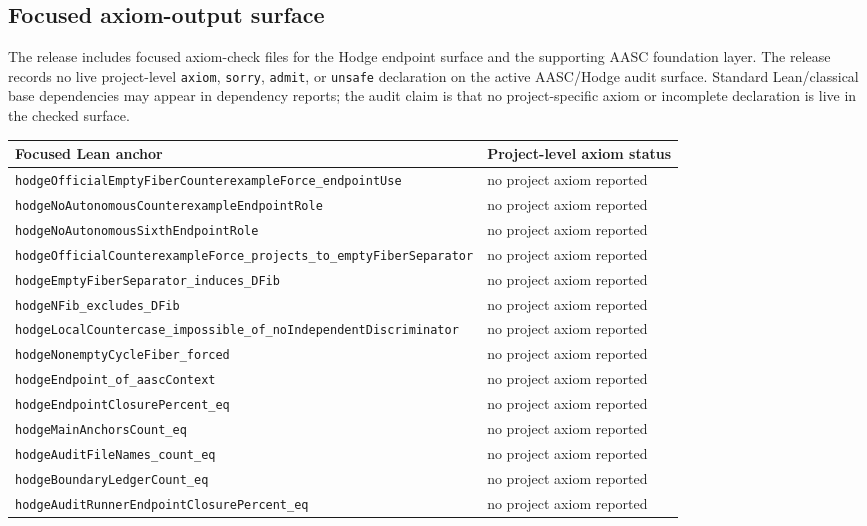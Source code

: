 \documentclass[11pt]{article}
\begin{document}
\subsection{Focused axiom-output surface}

The release includes focused axiom-check files for the Hodge endpoint surface and the supporting AASC foundation layer. The release records no live project-level \texttt{axiom}, \texttt{sorry}, \texttt{admit}, or \texttt{unsafe} declaration on the active AASC/Hodge audit surface. Standard Lean/classical base dependencies may appear in dependency reports; the audit claim is that no project-specific axiom or incomplete declaration is live in the checked surface.

{\scriptsize
\begin{longtable}{p{}p{}}
\toprule Focused Lean anchor & Project-level axiom status\\ \midrule\endhead
\texttt{hodgeOfficialEmptyFiberCounterexampleForce\_endpointUse} & no project axiom reported\\
\texttt{hodgeNoAutonomousCounterexampleEndpointRole} & no project axiom reported\\
\texttt{hodgeNoAutonomousSixthEndpointRole} & no project axiom reported\\
\texttt{hodgeOfficialCounterexampleForce\_projects\_to\_emptyFiberSeparator} & no project axiom reported\\
\texttt{hodgeEmptyFiberSeparator\_induces\_DFib} & no project axiom reported\\
\texttt{hodgeNFib\_excludes\_DFib} & no project axiom reported\\
\texttt{hodgeLocalCountercase\_impossible\_of\_noIndependentDiscriminator} & no project axiom reported\\
\texttt{hodgeNonemptyCycleFiber\_forced} & no project axiom reported\\
\texttt{hodgeEndpoint\_of\_aascContext} & no project axiom reported\\
\texttt{hodgeEndpointClosurePercent\_eq} & no project axiom reported\\
\texttt{hodgeMainAnchorsCount\_eq} & no project axiom reported\\
\texttt{hodgeAuditFileNames\_count\_eq} & no project axiom reported\\
\texttt{hodgeBoundaryLedgerCount\_eq} & no project axiom reported\\
\texttt{hodgeAuditRunnerEndpointClosurePercent\_eq} & no project axiom reported\\
\bottomrule
\end{longtable}
}
\end{document}
